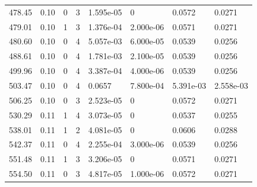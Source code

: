 \documentclass[preview]{standalone}
\begin{document}
{{{\begin{tabular}{L{1.2cm}C{1.2cm} C{0.3cm}C{0.5cm} C{1.4cm}C{1.4cm} C{1.4cm}C{1.4cm}}
  478.45  &  0.10  & 0     &  3 &  1.595e-05  & 0  & 0.0572 &  0.0271   \\ 
  479.01  &  0.10  & 1     &  3 &  1.376e-04  & 2.000e-06  & 0.0571 &  0.0271   \\ 
  480.60  &  0.10  & 0     &  4 &  5.057e-03  & 6.000e-05  & 0.0539 &  0.0256   \\ 
  488.61  &  0.10  & 0     &  4 &  1.781e-03  & 2.100e-05  & 0.0539 &  0.0256   \\ 
  499.96  &  0.10  & 0     &  4 &  3.387e-04  & 4.000e-06  & 0.0539 &  0.0256   \\ 
  503.47  &  0.10  & 0     &  4 &  0.0657  & 7.800e-04  & 5.391e-03 &  2.558e-03   \\ 
  506.25  &  0.10  & 0     &  3 &  2.523e-05  & 0  & 0.0572 &  0.0271   \\ 
  530.29  &  0.11  & 1     &  4 &  3.073e-05  & 0  & 0.0537 &  0.0255   \\ 
  538.01  &  0.11  & 1     &  2 &  4.081e-05  & 0  & 0.0606 &  0.0288   \\ 
  542.37  &  0.11  & 0     &  4 &  2.255e-04  & 3.000e-06  & 0.0539 &  0.0256   \\ 
  551.48  &  0.11  & 1     &  3 &  3.206e-05  & 0  & 0.0571 &  0.0271   \\ 
  554.50  &  0.11  & 0     &  3 &  4.817e-05  & 1.000e-06  & 0.0572 &  0.0271   \\ 
\hline 
\end{tabular} 

}}}
\end{document}
